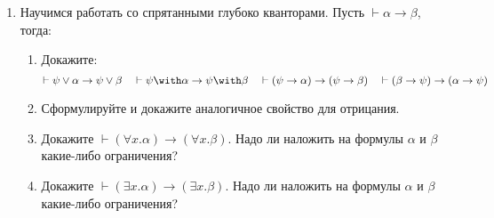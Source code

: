 \documentclass[10pt,a4paper,oneside]{article}
\begin{document}
\begin{enumerate}

\item Научимся работать со спрятанными глубоко кванторами. Пусть $\vdash\alpha\rightarrow\beta$, тогда:
\begin{enumerate}
\item Докажите: $$\vdash\psi\vee\alpha \rightarrow \psi\vee\beta\quad\vdash\psi\with\alpha \rightarrow \psi\with\beta\quad
\vdash(\psi\rightarrow\alpha) \rightarrow (\psi\rightarrow\beta)\quad\vdash(\beta\rightarrow\psi) \rightarrow (\alpha\rightarrow\psi)$$
\item Сформулируйте и докажите аналогичное свойство для отрицания.
\item Докажите $\vdash(\forall x.\alpha)\rightarrow(\forall x.\beta)$. 
Надо ли наложить на формулы $\alpha$ и $\beta$ какие-либо ограничения?
\item Докажите $\vdash(\exists x.\alpha)\rightarrow(\exists x.\beta)$. 
Надо ли наложить на формулы $\alpha$ и $\beta$ какие-либо ограничения?
\end{enumerate}

%
%
%
\end{enumerate}
\end{document}
